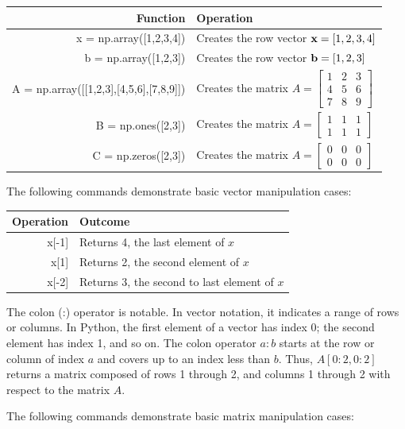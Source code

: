{\footnotesize
\begin{tabular}{r|l}
Function 						& Operation \\
\hline
{\s x = np.array([1,2,3,4])} 	&   Creates the row vector $\textbf{x} = [1,2,3,4]$\\
{\s b = np.array([1,2,3])}		&   Creates the row vector $\textbf{b} = [1,2,3]$\\
{\s A = np.array([[1,2,3],[4,5,6],[7,8,9]])}  			&   Creates the matrix $ A = \begin{bmatrix} 1 & 2 & 3\\ 4 & 5 & 6 \\ 7 & 8 & 9 \end{bmatrix} $\\
{\s B = np.ones([2,3])}   		&   Creates the matrix $ A = \begin{bmatrix} 1 & 1 & 1\\ 1 & 1 & 1 \end{bmatrix} $\\
{\s C = np.zeros([2,3])}   		&   Creates the matrix $ A = \begin{bmatrix} 0 & 0 & 0\\ 0 & 0 & 0 \end{bmatrix} $\\
\hline
\end{tabular}
}

\vs
The following commands demonstrate basic vector manipulation cases:
\vs

\begin{tabular}{r|l}
Operation 	& Outcome \\
\hline
{\s x[-1]} 	&   Returns 4, the last element of $x$\\
{\s x[1]} 	&   Returns 2, the second element of $x$\\
{\s x[-2]} 	&  Returns 3, the second to last element of $x$\\
\hline
\end{tabular}

\vs
The colon (:) operator is notable. In vector notation, it indicates a range of rows or columns. In Python, the first element of a vector has index 0; the second element has index 1, and so on. The colon operator $a:b$ starts at the row or column  of index $a$ and covers up to an index less than $b$. Thus,  $A[0:2,0:2]$ returns a matrix composed of rows 1 through 2, and columns 1 through 2 with respect to the matrix $A$. 

The following commands demonstrate basic matrix manipulation cases:
\vs

